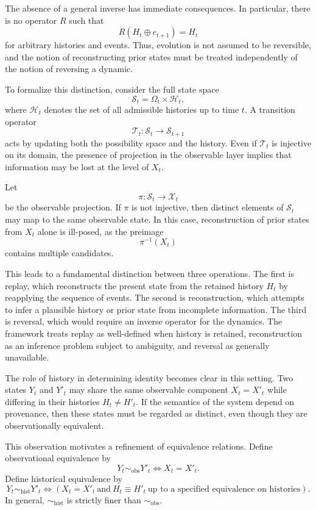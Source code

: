 \documentclass[11pt,oneside]{article}
\begin{document}
The absence of a general inverse has immediate consequences. In particular, there is no operator \( R \) such that
\[
R(H_t \oplus e_{t+1}) = H_t
\]
for arbitrary histories and events. Thus, evolution is not assumed to be reversible, and the notion of reconstructing prior states must be treated independently of the notion of reversing a dynamic.

To formalize this distinction, consider the full state space
\[
\mathcal{S}_t = \Omega_t \times \mathcal{H}_t,
\]
where \( \mathcal{H}_t \) denotes the set of all admissible histories up to time \( t \). A transition operator
\[
\mathcal{T}_t : \mathcal{S}_t \to \mathcal{S}_{t+1}
\]
acts by updating both the possibility space and the history. Even if \( \mathcal{T}_t \) is injective on its domain, the presence of projection in the observable layer implies that information may be lost at the level of \( X_t \).

Let
\[
\pi : \mathcal{S}_t \to \mathcal{X}_t
\]
be the observable projection. If \( \pi \) is not injective, then distinct elements of \( \mathcal{S}_t \) may map to the same observable state. In this case, reconstruction of prior states from \( X_t \) alone is ill-posed, as the preimage
\[
\pi^{-1}(X_t)
\]
contains multiple candidates.

This leads to a fundamental distinction between three operations. The first is replay, which reconstructs the present state from the retained history \( H_t \) by reapplying the sequence of events. The second is reconstruction, which attempts to infer a plausible history or prior state from incomplete information. The third is reversal, which would require an inverse operator for the dynamics. The framework treats replay as well-defined when history is retained, reconstruction as an inference problem subject to ambiguity, and reversal as generally unavailable.

The role of history in determining identity becomes clear in this setting. Two states \( Y_t \) and \( Y'_t \) may share the same observable component \( X_t = X'_t \) while differing in their histories \( H_t \neq H'_t \). If the semantics of the system depend on provenance, then these states must be regarded as distinct, even though they are observationally equivalent.

This observation motivates a refinement of equivalence relations. Define observational equivalence by
\[
Y_t \sim_{\mathrm{obs}} Y'_t \iff X_t = X'_t.
\]
Define historical equivalence by
\[
Y_t \sim_{\mathrm{hist}} Y'_t \iff (X_t = X'_t \ \text{and} \ H_t \equiv H'_t \ \text{up to a specified equivalence on histories}).
\]
In general, \( \sim_{\mathrm{hist}} \) is strictly finer than \( \sim_{\mathrm{obs}} \).
\end{document}
